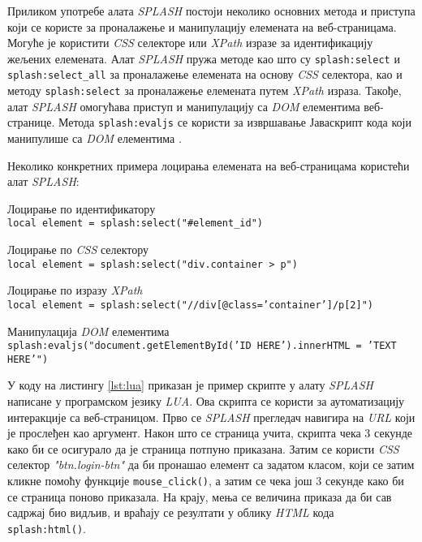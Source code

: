 \documentclass[12pt,oneside]{memoir}
\begin{document}
Приликом употребе алата \textit{SPLASH} постоји неколико основних метода и приступа који се користе за проналажење и манипулацију елемената на веб-страницама. Могуће је користити \textit{CSS} селекторе или \textit{XPath} изразе за идентификацију жељених елемената. Алат \textit{SPLASH} пружа методе као што су \texttt{splash:select} и \texttt{splash:select\_all} за проналажење елемената на основу \textit{CSS} селектора, као и методу \texttt{splash:select} за проналажење елемената путем \textit{XPath} израза. Такође, алат \textit{SPLASH} омогућава приступ и манипулацију са \textit{DOM} елементима веб-странице. Метода \texttt{splash:evaljs} се користи за извршавање Јаваскрипт кода који манипулише са \textit{DOM} елементима \cite{splashDocs}.

Неколико конкретних примера лоцирања елемената на веб-страницама користећи алат \textit{SPLASH}:
\begin{description}
    \item Лоцирање по идентификатору\\
        \texttt{local element = splash:select("\#element\_id")}
    \item Лоцирање по \textit{CSS} селектору\\   
        \texttt{local element = splash:select("div.container > p")}
    \item Лоцирање по изразу \textit{XPath}\\ 
        \texttt{local element = splash:select("//div[@class='container']/p[2]")}
    \item Манипулација \textit{DOM} елементима\\
    \texttt{splash:evaljs("document.getElementById('ID HERE').innerHTML = 'TEXT HERE'")}
\end{description}

У коду на листингу \ref{lst:lua} приказан је пример скрипте у алату \textit{SPLASH} написане у програмском језику \textit{LUA}. Ова скрипта се користи за аутоматизацију интеракције са веб-страницом. Прво се \textit{SPLASH} прегледач навигира на \textit{URL} који је прослеђен као аргумент. Након што се страница учита, скрипта чека 3 секунде како би се осигурало да је страница потпуно приказана. Затим се користи \textit{CSS} селектор \textit{"btn.login-btn"} да би пронашао елемент са задатом класом, који се затим кликне помоћу функције \texttt{mouse\_click()}, а затим се чека још 3 секунде како би се страница поново приказала. На крају, мења се величина приказа да би сав садржај био видљив, и враћају се резултати у облику \textit{HTML} кода \texttt{splash:html()}.
\end{document}

